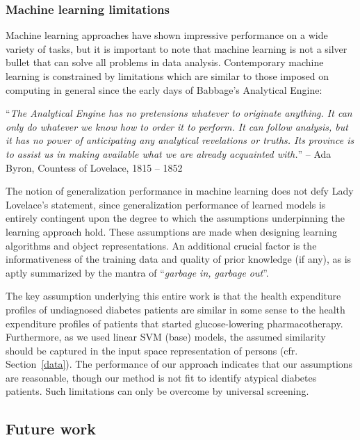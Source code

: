 \subsubsection{Machine learning limitations}
Machine learning approaches have shown impressive performance on a wide variety of tasks, but it is important to note that machine learning is not a silver bullet that can solve all problems in data analysis. Contemporary machine learning is constrained by limitations which are similar to those imposed on computing in general since the early days of Babbage's Analytical Engine:

\begin{center}
\begin{minipage}{0.93\textwidth}
``\emph{The Analytical Engine has no pretensions whatever to originate anything. It can only do whatever we know how to order it to perform. It can follow analysis, but it has no power of anticipating any analytical revelations or truths. Its province is to assist us in making available what we are already acquainted with.}''
-- Ada Byron, Countess of Lovelace, 1815 -- 1852
\end{minipage}
\end{center}

The notion of generalization performance in machine learning does not defy Lady Lovelace's statement, since generalization performance of learned models is entirely contingent upon the degree to which the assumptions underpinning the learning approach hold. These assumptions are made when designing learning algorithms and object representations. An additional crucial factor is the informativeness of the training data and quality of prior knowledge (if any), as is aptly summarized by the mantra of ``\emph{garbage in, garbage out}''.%

The key assumption underlying this entire work is that the health expenditure profiles of undiagnosed diabetes patients are similar in some sense to the health expenditure profiles of patients that started glucose-lowering pharmacotherapy. Furthermore, as we used linear SVM (base) models, the assumed similarity should be captured in the input space representation of persons (cfr. Section~\ref{data}). The performance of our approach indicates that our assumptions are reasonable, though our method is not fit to identify atypical diabetes patients. Such limitations can only be overcome by universal screening.

\subsection{Future work} 


